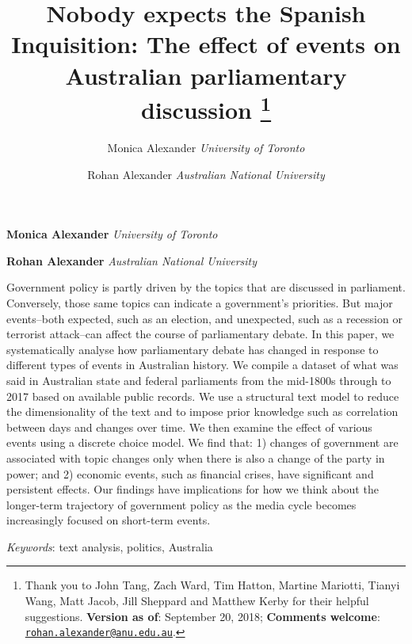 \documentclass[12pt,]{article}
\title{Nobody expects the Spanish Inquisition: The effect of events on
Australian parliamentary discussion \thanks{Thank you to John Tang, Zach Ward, Tim Hatton, Martine Mariotti, Tianyi
Wang, Matt Jacob, Jill Sheppard and Matthew Kerby for their helpful
suggestions. \textbf{Version as of}: September 20, 2018;
\textbf{Comments welcome}:
\href{mailto:rohan.alexander@anu.edu.au}{\nolinkurl{rohan.alexander@anu.edu.au}}.}  }
\author{\Large Monica Alexander\vspace{0.05in} \newline\normalsize\emph{University of Toronto}   \and \Large Rohan Alexander\vspace{0.05in} \newline\normalsize\emph{Australian National University}  }
\date{}
\newcommand*{\authorfont}{\fontfamily{phv}\selectfont}
\renewenvironment{abstract}
 {{%
    \setlength{\leftmargin}{0mm}
    \setlength{\rightmargin}{\leftmargin}%
  }%
  \relax}
 {\endlist}
\theoremstyle{definition}
\theoremstyle{definition}
\theoremstyle{definition}
\theoremstyle{remark}
\begin{document}
	
%

{%
\setlength{\parindent}{0pt}
\thispagestyle{plain}
{\fontsize{18}{20}\selectfont\raggedright 
\maketitle  %

}

{
   \vskip 13.5pt\relax \normalsize\fontsize{11}{12} 
\textbf{\authorfont Monica Alexander} \hskip 15pt \emph{\small University of Toronto}   \par \textbf{\authorfont Rohan Alexander} \hskip 15pt \emph{\small Australian National University}   

}

}








\begin{abstract}

    \hbox{\vrule height .2pt width 39.14pc}

    \vskip 8.5pt %

\noindent Government policy is partly driven by the topics that are discussed in
parliament. Conversely, those same topics can indicate a government's
priorities. But major events--both expected, such as an election, and
unexpected, such as a recession or terrorist attack--can affect the
course of parliamentary debate. In this paper, we systematically analyse
how parliamentary debate has changed in response to different types of
events in Australian history. We compile a dataset of what was said in
Australian state and federal parliaments from the mid-1800s through to
2017 based on available public records. We use a structural text model
to reduce the dimensionality of the text and to impose prior knowledge
such as correlation between days and changes over time. We then examine
the effect of various events using a discrete choice model. We find
that: 1) changes of government are associated with topic changes only
when there is also a change of the party in power; and 2) economic
events, such as financial crises, have significant and persistent
effects. Our findings have implications for how we think about the
longer-term trajectory of government policy as the media cycle becomes
increasingly focused on short-term events.


\vskip 8.5pt \noindent \emph{Keywords}: text analysis, politics, Australia \par

    \hbox{\vrule height .2pt width 39.14pc}



\end{abstract}
\end{document}
